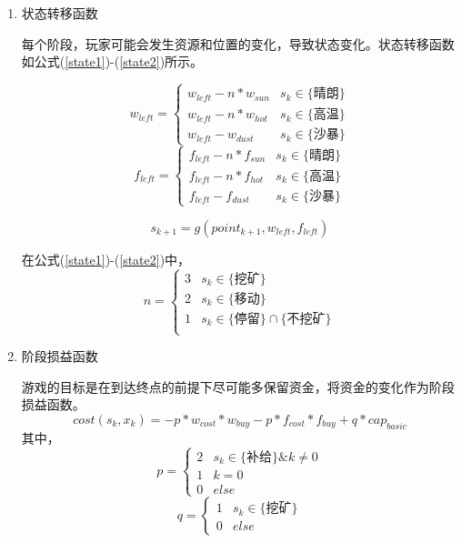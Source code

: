 \documentclass[withoutpreface,bwprint]{cumcmthesis} %
\begin{document}
\begin{enumerate}
\item 状态转移函数

每个阶段，玩家可能会发生资源和位置的变化，导致状态变化。状态转移函数如公式(\ref{state1})-(\ref{state2})所示。

\begin{equation}
    w_{left}=
    \begin{cases}
        w_{left}-n*w_{sun}& s_k \in \text{\{晴朗\}}\\
        w_{left}-n*w_{hot}& s_k \in \text{\{高温\}}
        \\
        w_{left}-w_{dust}& s_k \in \text{\{沙暴\}}
    \end{cases}
    \label{state1}
\end{equation}
\begin{equation}
    f_{left}=
    \begin{cases}
        f_{left}-n*f_{sun}& s_k \in \text{\{晴朗\}}\\
        f_{left}-n*f_{hot}& s_k \in \text{\{高温\}}
        \\
        f_{left}-f_{dust}& s_k \in \text{\{沙暴\}}
    \end{cases}
\end{equation}

\begin{equation}
    s_{k+1}=g(point_{k+1},w_{left},f_{left})
    \label{state2}
\end{equation}

在公式(\ref{state1})-(\ref{state2})中，
\begin{equation}
    n=
    \begin{cases}
        3 & s_k \in \text{\{挖矿\}}\\
        2 & s_k \in \text{\{移动\}}\\
        1 & s_k \in \text{\{停留\}} \cap \text{\{不挖矿\}}\\
    \end{cases}
\end{equation}


\item 阶段损益函数

游戏的目标是在到达终点的前提下尽可能多保留资金，将资金的变化作为阶段损益函数。
\begin{equation}
    cost(s_k,x_k)=-p*w_{cost}*w_{buy}-p*f_{cost}*f_{buy}+q*cap_{basic}
\end{equation}
其中，
\begin{equation}
    p=
    \begin{cases}
        2 & s_k \in \text{\{补给\}} \& k \neq 0\\
        1 & k=0 \\
        0 & else
    \end{cases}
\end{equation}
\begin{equation}
    q=
    \begin{cases}
        1 & s_k \in \text{\{挖矿\}}\\
        0 & else
    \end{cases}
\end{equation}
\end{enumerate}
\end{document}
